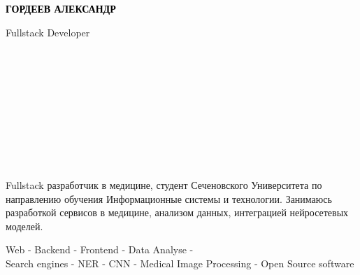 \documentclass[9pt]{developercv}
\begin{document}

\begin{minipage}[t]{0.5\textwidth} 
	\vspace{-\baselineskip}
	{ \fontsize{16}{20} \textcolor{black}{\textbf{\MakeUppercase{Гордеев Александр}}}}
	
	\vspace{6pt}
	
	{\Large Fullstack Developer}
\end{minipage}
\hfill
\begin{minipage}[t]{0.2\textwidth}
	\vspace{-\baselineskip}
    \\\\
    \\\\
    \\
	
\end{minipage}
\begin{minipage}[t]{0.27\textwidth}
	\vspace{-\baselineskip}
	\\\\
    \\
       
    
\end{minipage}



\begin{minipage}[t]{0.46\textwidth}
	\vspace{-6pt}
 
        Fullstack разработчик в медицине, студент Сеченовского Университета по направлению обучения Информационные
        системы и технологии. Занимаюсь разработкой сервисов в медицине, анализом данных, интеграцией нейросетевых
        моделей.
        \\
\end{minipage}
\hfill %
\begin{minipage}[t]{0.465\textwidth}
    \vspace{-6pt}
    
    Web - Backend - Frontend - Data Analyse - \\
    Search engines - NER - CNN - Medical Image Processing - Open Source software
    
\end{minipage}
\end{document}
